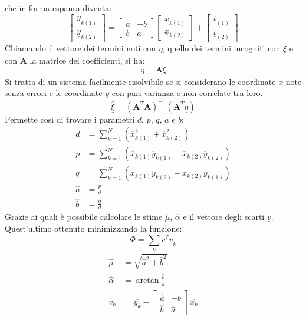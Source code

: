 che in forma espansa diventa:
\begin{equation}
	\begin{bmatrix}
		\underline{y}_{k(1)} \\ 
		\underline{y}_{k(2)}
	\end{bmatrix} 
	=
	\begin{bmatrix}
		{a} & {-b} \\ 
		{b} & {a}
	\end{bmatrix}
	\begin{bmatrix}
		\underline{x}_{k(1)} \\ 
		\underline{x}_{k(2)}
	\end{bmatrix}
	+
	\begin{bmatrix}
		\underline{t}_{(1)} \\ 
		\underline{t}_{(2)}
	\end{bmatrix}
\end{equation}
Chiamando il vettore dei termini noti con $\underline{\eta}$, quello dei termini incogniti con $\underline{\xi}$ e con $\mathbf{A}$ la matrice dei coefficienti, si ha:
\begin{equation}
	\underline{\eta}=\mathbf{A} \underline{\xi}
\end{equation}
Si tratta di un sistema facilmente risolvibile se si considerano le coordinate $x$ note senza errori e le coordinate $y$ con pari varianza e non correlate tra loro. 
\begin{equation}
	\hat{\underline{\xi}}=	
	\left(\mathbf{A}^T \mathbf{A}\right)^{-1}
	\left(\mathbf{A}^T \underline{\eta}\right)
\end{equation}
Permette così di trovare i parametri $d$, $p$, $q$, $a$ e $b$:
\begin{align} d &=\sum_{k=1}^{N}\left(\overline{x}_{k(1)}^{2}+\overline{x}_{k(2)}^{2}\right) \\ 
p &=\sum_{k=1}^{N}\left(\overline{x}_{k(1)} \overline{y}_{k(1)}+\overline{x}_{k(2)} \overline{y}_{k(2)}\right) \\ 
q &=\sum_{k=1}^{N}\left(\overline{x}_{k(1)} \overline{y}_{k(2)}-\overline{x}_{k(2)} \overline{y}_{k(1)}\right) \\
\hat{a} &= \frac{p}{d} \\
\hat{b} &= \frac{q}{d}
\end{align}
Grazie ai quali è possibile calcolare le stime $\hat{\mu}$, $\hat{\alpha}$ e il vettore degli scarti $\underline{v}$.
Quest'ultimo ottenuto minimizzando la funzione:
\begin{equation}
	\Phi = \sum_k \underline{v}^T\underline{v}_k
\end{equation}
\begin{align}
	\hat{\mu} &= \sqrt{\hat{a}^2 + \hat{b}^2}\\
	\hat{\alpha} &= \arctan\frac{\hat{b}}{\hat{a}}\\
	\underline{v_k} &= 
	\overline{\underline{y_{k}}}-
\begin{bmatrix}
	\hat{a} & -\hat{b} \\ 
	\hat{b} & \hat{a}
\end{bmatrix} 
\overline{x_{k}}
\end{align}
